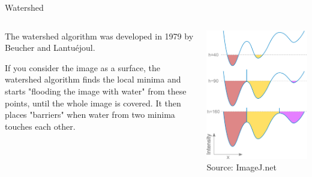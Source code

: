 \documentclass[9pt, aspectratio=169]{beamer}
\begin{document}
\begin{frame}
    {Watershed}
    \begin{columns}
        \begin{column}{.6\textwidth}
            The watershed algorithm was developed in 1979 by Beucher and Lantuéjoul.
            \vspace{2em}

            If you consider the image as a surface, the watershed algorithm finds the local minima and starts "flooding the image with water" from these points, until the whole image is covered. It then places "barriers" when water from two minima touches each other.
        \end{column}
        \begin{column}{.4\textwidth}

            \includegraphics[width=\textwidth, trim = 0 0 0 -5em]{watershed-flooding-graph.png}
            \footnotesize
            Source: ImageJ.net
        \end{column}
    \end{columns}
\end{frame}
\end{document}
